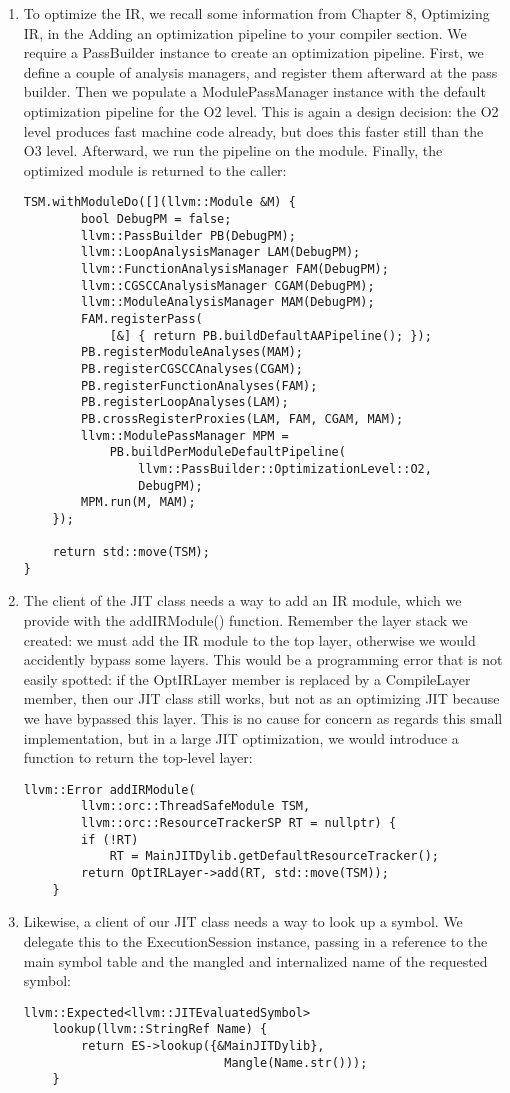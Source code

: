 \begin{enumerate}
\item To optimize the IR, we recall some information from Chapter 8, Optimizing IR, in the Adding an optimization pipeline to your compiler section. We require a PassBuilder instance to create an optimization pipeline. First, we define a couple of analysis managers, and register them afterward at the pass builder. Then we populate a ModulePassManager instance with the default optimization pipeline for the O2 level. This is again a design decision: the O2 level produces fast machine code already, but does this faster still than the O3 level. Afterward, we run the pipeline on the module. Finally, the optimized module is returned to the caller:
\begin{lstlisting}[caption={}]
	TSM.withModuleDo([](llvm::Module &M) {
		bool DebugPM = false;
		llvm::PassBuilder PB(DebugPM);
		llvm::LoopAnalysisManager LAM(DebugPM);
		llvm::FunctionAnalysisManager FAM(DebugPM);
		llvm::CGSCCAnalysisManager CGAM(DebugPM);
		llvm::ModuleAnalysisManager MAM(DebugPM);
		FAM.registerPass(
			[&] { return PB.buildDefaultAAPipeline(); });
		PB.registerModuleAnalyses(MAM);
		PB.registerCGSCCAnalyses(CGAM);
		PB.registerFunctionAnalyses(FAM);
		PB.registerLoopAnalyses(LAM);
		PB.crossRegisterProxies(LAM, FAM, CGAM, MAM);
		llvm::ModulePassManager MPM =
			PB.buildPerModuleDefaultPipeline(
				llvm::PassBuilder::OptimizationLevel::O2,
				DebugPM);
		MPM.run(M, MAM);
	});

	return std::move(TSM);
}
\end{lstlisting}

\item The client of the JIT class needs a way to add an IR module, which we provide with the addIRModule() function. Remember the layer stack we created: we must add the IR module to the top layer, otherwise we would accidently bypass some layers. This would be a programming error that is not easily spotted: if the OptIRLayer member is replaced by a CompileLayer member, then our JIT class still works, but not as an optimizing JIT because we have bypassed this layer. This is no cause for concern as regards this small implementation, but in a large JIT optimization, we would introduce a function to return the top-level layer:
\begin{lstlisting}[caption={}]
	llvm::Error addIRModule(
		llvm::orc::ThreadSafeModule TSM,
		llvm::orc::ResourceTrackerSP RT = nullptr) {
		if (!RT)
			RT = MainJITDylib.getDefaultResourceTracker();
		return OptIRLayer->add(RT, std::move(TSM));
	}
\end{lstlisting}

\item Likewise, a client of our JIT class needs a way to look up a symbol. We delegate this to the ExecutionSession instance, passing in a reference to the main symbol table and the mangled and internalized name of the requested symbol:
\begin{lstlisting}[caption={}]
	llvm::Expected<llvm::JITEvaluatedSymbol>
	lookup(llvm::StringRef Name) {
		return ES->lookup({&MainJITDylib},
							Mangle(Name.str()));
	}
\end{lstlisting}

\end{enumerate}


